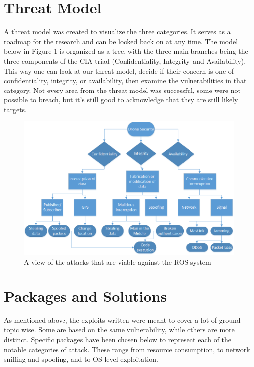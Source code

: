 \documentclass[IEEEtran,letterpaper,10pt,notitlepage,draftclsnofoot,onecolumn]{article}
\begin{document}
\section{Threat Model}
A threat model was created to visualize the three categories. It serves as a roadmap for the research and can be looked back on at any time.
The model below in Figure 1 is organized as a tree, with the three main branches being the three components of the CIA triad (Confidentiality, Integrity, and Availability).
This way one can look at our threat model, decide if their concern is one of confidentiality, integrity, or availability, then examine the vulnerabilities in that category.
Not every area from the threat model was successful, some were not possible to breach, but it’s still good to acknowledge that they are still likely targets.

\begin{figure}[H]
    \centering
    \includegraphics[width=\textwidth]{model}
    \caption{A view of the attacks that are viable against the ROS system}
\end{figure}

\section{Packages and Solutions}
As mentioned above, the exploits written were meant to cover a lot of ground topic wise.
Some are based on the same vulnerability, while others are more distinct.
Specific packages have been chosen below to represent each of the notable categories of attack.
These range from resource consumption, to network sniffing and spoofing, and to OS level exploitation.
\end{document}
